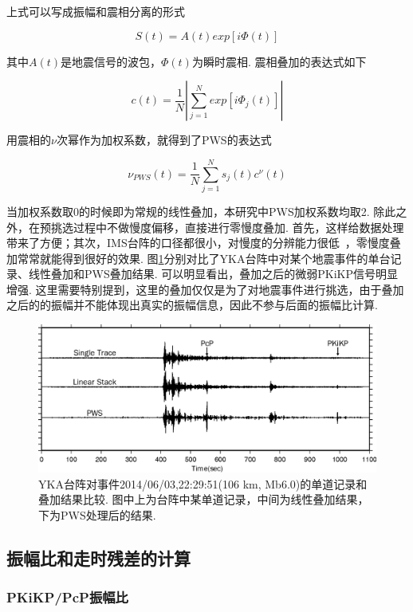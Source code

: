 上式可以写成振幅和震相分离的形式

\begin{equation}
S(t) = A(t) exp[i \Phi (t)]
\end{equation}

其中$A(t)$是地震信号的波包，$\Phi (t)$为瞬时震相. 震相叠加的表达式如下

\begin{equation}
c(t) = \frac{1}{N} \left| \sum_{j=1}^{N} exp[i \Phi_j (t)] \right|
\end{equation}

用震相的$\nu$次幂作为加权系数，就得到了PWS的表达式

\begin{equation}
 \nu_{PWS}(t) = \frac{1}{N} \sum_{j=1}^{N} s_j (t)c^{\nu} (t)
\end{equation}

当加权系数取0的时候即为常规的线性叠加，本研究中PWS加权系数均取2. 除此之外，在预挑选过程中不做慢度偏移，直接进行零慢度叠加. 首先，这样给数据处理带来了方便；其次，IMS台阵的口径都很小，对慢度的分辨能力很低~\citep{Rost2002}，零慢度叠加常常就能得到很好的效果. 图\ref{fig:stack}分别对比了YKA台阵中对某个地震事件的单台记录、线性叠加和PWS叠加结果. 可以明显看出，叠加之后的微弱PKiKP信号明显增强. 这里需要特别提到，这里的叠加仅仅是为了对地震事件进行挑选，由于叠加之后的的振幅并不能体现出真实的振幅信息，因此不参与后面的振幅比计算. 

\begin{figure}
\centering
\includegraphics[width=0.8\linewidth]{fig/chap2/stack}
\caption{YKA台阵对事件2014/06/03,22:29:51(106 km, Mb6.0)的单道记录和叠加结果比较. 图中上为台阵中某单道记录，中间为线性叠加结果，下为PWS处理后的结果. }
\label{fig:stack}
\end{figure}

\subsection{振幅比和走时残差的计算}

\subsubsection{PKiKP/PcP振幅比}

